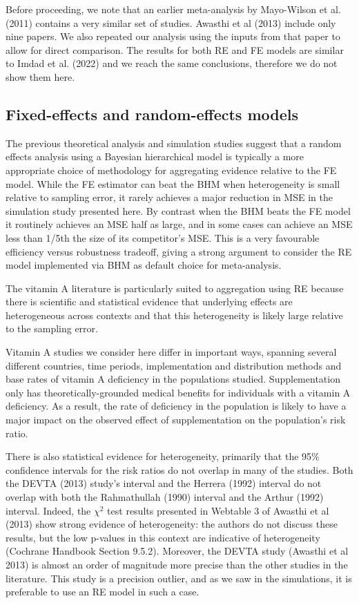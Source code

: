 \documentclass[12pt]{article}
\begin{document}
Before proceeding, we note that an earlier meta-analysis by Mayo-Wilson et al. (2011) contains a very similar set of studies. Awasthi et al (2013) include only nine papers. We also repeated our analysis using the inputs from that paper to allow for direct comparison. The results for both RE and FE models are similar to Imdad et al. (2022) and we reach the same conclusions, therefore we do not show them here.


\subsection{Fixed-effects and random-effects models}

The previous theoretical analysis and simulation studies suggest that a random effects analysis using a Bayesian hierarchical model is typically a more appropriate choice of methodology for aggregating evidence relative to the FE model. While the FE estimator can beat the BHM when heterogeneity is small relative to sampling error, it rarely achieves a major reduction in MSE in the simulation study presented here. By contrast when the BHM beats the FE model it routinely achieves an MSE half as large, and in some cases can achieve an MSE less than 1/5th the size of its competitor's MSE. This is a very favourable efficiency versus robustness tradeoff, giving a strong argument to consider the RE model implemented via BHM as default choice for meta-analysis. 

The vitamin A literature is particularly suited to aggregation using RE because there is scientific and statistical evidence that underlying effects are heterogeneous across contexts and that this heterogeneity is likely large relative to the sampling error. 

Vitamin A studies we consider here differ in important ways, spanning several different countries, time periods, implementation and distribution methods and base rates of vitamin A deficiency in the populations studied. Supplementation only has theoretically-grounded medical benefits for individuals with a vitamin A deficiency. As a result, the rate of deficiency in the population is likely to have a major impact on the observed effect of supplementation on the population's risk ratio. 

There is also statistical evidence for heterogeneity, primarily that the 95\% confidence intervals for the risk ratios do not overlap in many of the studies. Both the DEVTA (2013) study's interval and the Herrera (1992) interval do not overlap with both the Rahmathullah (1990) interval and the Arthur (1992) interval. Indeed, the $\chi^2$ test results presented in Webtable 3 of Awasthi et al (2013) show strong evidence of heterogeneity: the authors do not discuss these results, but the low p-values in this context are indicative of heterogeneity (Cochrane Handbook Section 9.5.2). Moreover, the DEVTA study (Awasthi et al 2013) is almost an order of magnitude more precise than the other studies in the literature. This study is a precision outlier, and as we saw in the simulations, it is preferable to use an RE model in such a case.
\end{document}
